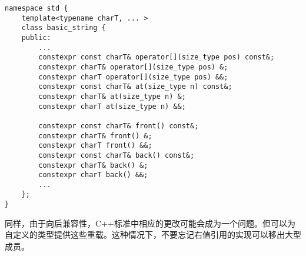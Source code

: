 \begin{lstlisting}[caption={}]
namespace std {
	template<typename charT, ... >
	class basic_string {
	public:
		...
		constexpr const charT& operator[](size_type pos) const&;
		constexpr charT& operator[](size_type pos) &;
		constexpr charT operator[](size_type pos) &&;
		constexpr const charT& at(size_type n) const&;
		constexpr charT& at(size_type n) &;
		constexpr charT at(size_type n) &&;
		
		constexpr const charT& front() const&;
		constexpr charT& front() &;
		constexpr charT front() &&;
		constexpr const charT& back() const&;
		constexpr charT& back() &;
		constexpr charT back() &&;
		...
	};
}
\end{lstlisting}

同样，由于向后兼容性，C++标准中相应的更改可能会成为一个问题。但可以为自定义的类型提供这些重载。这种情况下，不要忘记右值引用的实现可以移出大型成员。\par






















































